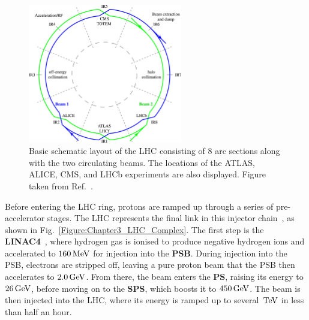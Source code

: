 \begin{figure}[h]
\centering
\includegraphics[width= 0.6\textwidth]{Figures/Chapter3/LHC_BasicLayout.jpg}
\caption[Basic schematic layout of the Large Hadron Collider]{Basic schematic layout of the LHC consisting of 8 arc sections along with the two circulating beams. The locations of the ATLAS, ALICE, CMS, and LHCb experiments are also displayed. Figure taken from Ref.~\cite{LHC_BasicLayout}.}
\label{Figure:Chapter3_LHC_BasicLayout}
\end{figure}

\newpage
Before entering the LHC ring, protons are ramped up through a series of pre-accelerator stages. The LHC represents the final link in this injector chain~\cite{LHC_InjectorComplex}, as shown in Fig.~\ref{Figure:Chapter3_LHC_Complex}. The first step is the \textbf{\ac{LINAC4}}~\cite{LINAC4}, where hydrogen gas is ionised to produce negative hydrogen ions and accelerated to $160\,\text{Me\hspace{-.08em}V}$ for injection into the \textbf{\ac{PSB}}. During injection into the PSB, electrons are stripped off, leaving a pure proton beam that the PSB then accelerates to $2.0\,\text{Ge\hspace{-.08em}V}$. From there, the beam enters the \textbf{\ac{PS}}, raising its energy to $26\,\text{Ge\hspace{-.08em}V}$, before moving on to the \textbf{\ac{SPS}}, which boosts it to $450\,\text{Ge\hspace{-.08em}V}$. The beam is then injected into the LHC, where its energy is ramped up to several $\,\text{Te\hspace{-.08em}V}$ in less than half an hour.


